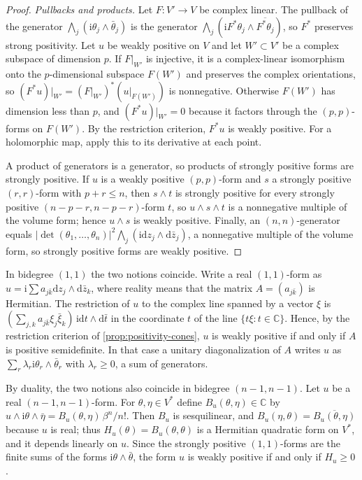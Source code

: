\begin{proof}
\emph{Pullbacks and products.} Let $F\colon V'\to V$ be complex linear. The pullback of the generator $\bigwedge_j(\mathrm i\theta_j\wedge\bar\theta_j)$ is the generator $\bigwedge_j(\mathrm iF^*\theta_j\wedge\overline{F^*\theta_j})$, so $F^*$ preserves strong positivity. Let $u$ be weakly positive on $V$ and let $W'\subset V'$ be a complex subspace of dimension $p$. If $F|_{W'}$ is injective, it is a complex-linear isomorphism onto the $p$-dimensional subspace $F(W')$ and preserves the complex orientations, so $(F^*u)|_{W'}=(F|_{W'})^*(u|_{F(W')})$ is nonnegative. Otherwise $F(W')$ has dimension less than $p$, and $(F^*u)|_{W'}=0$ because it factors through the $(p,p)$-forms on $F(W')$. By the restriction criterion, $F^*u$ is weakly positive. For a holomorphic map, apply this to its derivative at each point.

A product of generators is a generator, so products of strongly positive forms are strongly positive. If $u$ is a weakly positive $(p,p)$-form and $s$ a strongly positive $(r,r)$-form with $p+r\leq n$, then $s\wedge t$ is strongly positive for every strongly positive $(n-p-r,n-p-r)$-form $t$, so $u\wedge s\wedge t$ is a nonnegative multiple of the volume form; hence $u\wedge s$ is weakly positive. Finally, an $(n,n)$-generator equals $|\det(\theta_1,\ldots,\theta_n)|^2\bigwedge_j(\mathrm i\mathrm dz_j\wedge\mathrm d\bar z_j)$, a nonnegative multiple of the volume form, so strongly positive forms are weakly positive.
\end{proof}

In bidegree $(1,1)$ the two notions coincide. Write a real $(1,1)$-form as $u=\mathrm{i}\sum a_{j\bar k}\mathrm{d}z_j\wedge\mathrm{d}\bar z_k$, where reality means that the matrix $A=(a_{j\bar k})$ is Hermitian. The restriction of $u$ to the complex line spanned by a vector $\xi$ is $(\sum_{j,k}a_{j\bar k}\xi_j\bar\xi_k)\,\mathrm i\mathrm dt\wedge\mathrm d\bar t$ in the coordinate $t$ of the line $\{t\xi:t\in\mathbb C\}$. Hence, by the restriction criterion of \cref{prop:positivity-cones}, $u$ is weakly positive if and only if $A$ is positive semidefinite. In that case a unitary diagonalization of $A$ writes $u$ as $\sum_r\lambda_r\mathrm{i}\theta_r\wedge\bar\theta_r$ with $\lambda_r\geq0$, a sum of generators.

By duality, the two notions also coincide in bidegree $(n-1,n-1)$. Let $u$ be a real $(n-1,n-1)$-form. For $\theta,\eta\in V^*$ define $B_u(\theta,\eta)\in\mathbb C$ by $u\wedge\mathrm i\theta\wedge\bar\eta=B_u(\theta,\eta)\,\beta^n/n!$. Then $B_u$ is sesquilinear, and $B_u(\eta,\theta)=\overline{B_u(\theta,\eta)}$ because $u$ is real; thus $H_u(\theta)=B_u(\theta,\theta)$ is a Hermitian quadratic form on $V^*$, and it depends linearly on $u$. Since the strongly positive $(1,1)$-forms are the finite sums of the forms $\mathrm i\theta\wedge\bar\theta$, the form $u$ is weakly positive if and only if $H_u\geq0$.

